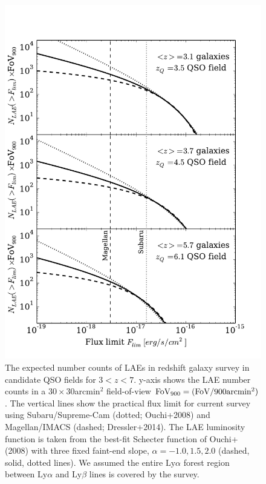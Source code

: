 \documentclass[useAMS,usenatbib,twocolumn]{mn2e}
\newcommand{\LyA}{\mbox{Ly}\alpha}
\begin{document}
\begin{figure}
 \begin{center}
  \includegraphics[angle=0,width=\columnwidth]{figure/LAE_number_counts.pdf}
  \caption{The expected number counts of LAEs in redshift galaxy survey in candidate QSO fields
    for $3<z<7$. y-axis shows the LAE number counts in a $30\times30$arcmin$^2$ field-of-view 
    $\rm{FoV_{900}=(FoV/900arcmin^2)}$. The vertical lines show the practical flux limit for
    current survey using Subaru/Supreme-Cam (dotted; Ouchi+2008) and Magellan/IMACS 
    (dashed; Dressler+2014). The LAE luminosity function is taken from the best-fit Schecter
    function of Ouchi+(2008) with three fixed faint-end slope, $\alpha=-1.0, 1.5, 2.0$ (dashed,
    solid, dotted lines). We assumed the entire $\LyA$ forest region between 
     $\LyA$ and $\mbox{Ly}\beta$ lines is covered by the survey. }
 \end{center}
\end{figure}
\end{document}
